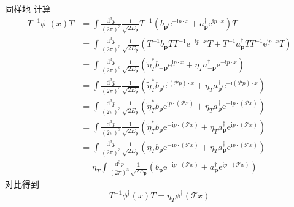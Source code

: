 同样地
计算
\begin{equation}
    \begin{aligned}
        T^{-1}\phi ^{\dagger}\left( x \right) T&=\int{\frac{\mathrm{d}^3p}{\left( 2\pi \right) ^3}}\frac{1}{\sqrt{2E_{\mathbf{p}}}}T^{-1}\left( b_{\mathbf{p}}\mathrm{e}^{-\mathrm{i}p\cdot x}+a_{\mathbf{p}}^{\dagger}\mathrm{e}^{\mathrm{i}p\cdot x} \right) T
\\
&=\int{\frac{\mathrm{d}^3p}{\left( 2\pi \right) ^3}}\frac{1}{\sqrt{2E_{\mathbf{p}}}}\left( T^{-1}b_{\mathbf{p}}TT^{-1}\mathrm{e}^{-\mathrm{i}p\cdot x}T+T^{-1}a_{\mathbf{p}}^{\dagger}TT^{-1}\mathrm{e}^{\mathrm{i}p\cdot x}T \right) 
\\
&=\int{\frac{\mathrm{d}^3p}{\left( 2\pi \right) ^3}}\frac{1}{\sqrt{2E_{\mathbf{p}}}}\left( \tilde{\eta}_{T}^{*}b_{-\mathbf{p}}\mathrm{e}^{\mathrm{i}p\cdot x}+\eta _Ta_{-\mathbf{p}}^{\dagger}\mathrm{e}^{-\mathrm{i}p\cdot x} \right) 
\\
&=\int{\frac{\mathrm{d}^3p}{\left( 2\pi \right) ^3}}\frac{1}{\sqrt{2E_{\mathbf{p}}}}\left( \tilde{\eta}_{T}^{*}b_{\mathbf{p}}\mathrm{e}^{\mathrm{i}\left( \mathcal{P} p \right) \cdot x}+\eta _Ta_{\mathbf{p}}^{\dagger}\mathrm{e}^{-\mathrm{i}\left( \mathcal{P} p \right) \cdot x} \right) 
\\
&=\int{\frac{\mathrm{d}^3p}{\left( 2\pi \right) ^3}}\frac{1}{\sqrt{2E_{\mathbf{p}}}}\left( \tilde{\eta}_{T}^{*}b_{\mathbf{p}}\mathrm{e}^{\mathrm{i}p\cdot \left( \mathcal{P} x \right)}+\eta _Ta_{\mathbf{p}}^{\dagger}\mathrm{e}^{-\mathrm{i}p\cdot \left( \mathcal{P} x \right)} \right) 
\\
&=\int{\frac{\mathrm{d}^3p}{\left( 2\pi \right) ^3}}\frac{1}{\sqrt{2E_{\mathbf{p}}}}\left( \tilde{\eta}_{T}^{*}b_{\mathbf{p}}\mathrm{e}^{-\mathrm{i}p\cdot (\mathcal{T} x)}+\eta _Ta_{\mathbf{p}}^{\dagger}\mathrm{e}^{\mathrm{i}p\cdot (\mathcal{T} x)} \right) 
\\
&=\int{\frac{\mathrm{d}^3p}{\left( 2\pi \right) ^3}}\frac{1}{\sqrt{2E_{\mathbf{p}}}}\left( \eta _Tb_{\mathbf{p}}\mathrm{e}^{-\mathrm{i}p\cdot (\mathcal{T} x)}+\eta _Ta_{\mathbf{p}}^{\dagger}\mathrm{e}^{\mathrm{i}p\cdot (\mathcal{T} x)} \right) 
\\
&=\eta _T\int{\frac{\mathrm{d}^3p}{\left( 2\pi \right) ^3}}\frac{1}{\sqrt{2E_{\mathbf{p}}}}\left( b_{\mathbf{p}}\mathrm{e}^{-\mathrm{i}p\cdot (\mathcal{T} x)}+a_{\mathbf{p}}^{\dagger}\mathrm{e}^{\mathrm{i}p\cdot (\mathcal{T} x)} \right) 
    \end{aligned}
\end{equation}
对比得到
\begin{equation}
    T^{-1}\phi ^{\dagger}\left( x \right) T=\eta _T\phi ^{\dagger}(\mathcal{T} x)
\end{equation}




